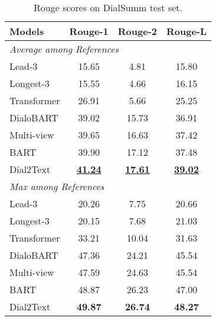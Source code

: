 \begin{table}
	\small
	\centering
	\begin{tabular}{lccc}
		\toprule[1pt]
		\textbf{Models} & \textbf{Rouge-1} & \textbf{Rouge-2} & \textbf{Rouge-L} \\
		\midrule[1pt]
		\multicolumn{4}{l}{\textit{Average among References}}\\
		{Lead-3} &15.65&4.81&15.80\\
		{Longest-3} &15.55&4.66&16.15 \\
		{Transformer} &26.91&5.66&25.25 \\
		{DialoBART} &39.02 &15.73 &36.91 \\
		{Multi-view} &39.65&16.63&37.42\\
		{BART} &39.90 &17.12 &37.48 \\
		{Dial2Text} &\underline{\textbf{41.24}} &\underline{\textbf{17.61}} &\underline{\textbf{39.02}} \\
		\midrule[1pt]
		\multicolumn{4}{l}{\textit{Max among References}}\\
		{Lead-3} &20.26&7.75&20.66\\
		{Longest-3} &20.15&7.68&21.03 \\
		{Transformer} &33.21&10.04&31.63 \\
		{DialoBART} & 47.36& 24.21& 45.54\\
		{Multi-view} &47.59&24.63&45.54\\
		{BART} &48.87 &26.23 &47.00 \\
		{Dial2Text} &\textbf{49.87} &\textbf{26.74} &\textbf{48.27} \\
		\bottomrule[1pt]
	\end{tabular}
	\caption{Rouge scores on DialSumm test set.}
	\label{tab:dialsummresults}
\end{table}



